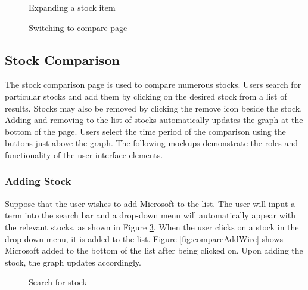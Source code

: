 \documentclass[11pt]{article}
\numberwithin{figure}{section}
\begin{document}
        
        \bigskip
        \begin{figure}[htp]
            \centering
              
            \caption{Expanding a stock item}
            \label{fig:expandListWire}
        \end{figure}
        \clearpage
        
        \begin{figure}[htp]
            \centering
            \caption{Switching to compare page}
            \label{fig:switchWire}
        \end{figure}
        
    \subsection{Stock Comparison}
        The stock comparison page is used to compare numerous stocks. Users search for particular stocks and add them by clicking on the desired stock from a list of results. Stocks may also be removed by clicking the remove icon beside the stock. Adding and removing to the list of stocks automatically updates the graph at the bottom of the page. Users select the time period of the comparison using the buttons just above the graph. The following mockups demonstrate the roles and functionality of the user interface elements.
        
        \subsubsection{Adding Stock}
            Suppose that the user wishes to add Microsoft to the list. The user will input a term into the search bar and a drop-down menu will automatically appear with the relevant stocks, as shown in Figure \ref{fig:compareSearchWire}. When the user clicks on a stock in the drop-down menu, it is added to the list. Figure \ref{fig:compareAddWire} shows Microsoft added to the bottom of the list after being clicked on. Upon adding the stock, the graph updates accordingly.
            
            \begin{figure}[htp]
                \centering
                \caption{Search for stock}
                \label{fig:compareSearchWire}
            \end{figure}
            \clearpage
            
\end{document}
